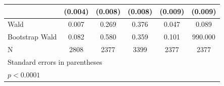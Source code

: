 \begin{table}[htbp]
\begin{tabular}{l*{5}{c}}
            &     (0.004)       &     (0.008)       &     (0.008)       &     (0.009)       &     (0.009)       \\
\hline
Wald        &       0.007       &       0.269       &       0.376       &       0.047       &       0.089       \\
Bootstrap Wald&       0.082       &       0.580       &       0.359       &       0.101       &     990.000       \\
N           &        2808       &        2377       &        3399       &        2377       &        2377       \\
\hline\hline
\multicolumn{6}{l}{\footnotesize Standard errors in parentheses}\\
\multicolumn{6}{l}{\footnotesize \sym{*} \(p<0.0001\)}\\
\end{tabular}
\end{table}
